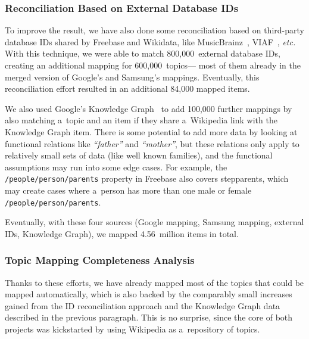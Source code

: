 \documentclass{acm_proc_article-sp}
\begin{document}
\subsubsection{Reconciliation Based on External Database IDs}

To improve the result, we have also done some reconciliation based on third-party database IDs
shared by Freebase and Wikidata, like MusicBrainz~\cite{musicbrainz},
VIAF~\cite{viaf}, \emph{etc.}
With this technique, we were able to match 800,000~external database IDs,
creating an additional mapping for 600,000~topics---%
most of them already in the merged version of Google's and Samsung's mappings.
Eventually, this reconciliation effort resulted in an additional 84,000 mapped items.

We also used Google's Knowledge Graph~\cite{singhal2012} to add 100,000 further mappings
by also matching a~topic and an item if they share a~Wikipedia link with the Knowledge Graph item.
There is some potential to add more data by looking at functional relations
like \textit{``father''} and \textit{``mother''},
but these relations only apply to relatively small sets of data
(like well known families), and the functional assumptions may run into some edge cases.
For example, the \texttt{/people/person/parents} property in Freebase also covers stepparents,
which may create cases where a~person has more than one male or female \texttt{/people/person/parents}.

Eventually, with these four sources (Google mapping, Samsung mapping, external IDs, Knowledge Graph),
we mapped 4.56~million items in total.

\subsubsection{Topic Mapping Completeness Analysis}

Thanks to these efforts, we have already mapped most of the topics that could be mapped automatically,
which is also backed by the comparably small increases gained from the ID reconciliation approach 
and the Knowledge Graph data described in the previous paragraph.
This is no surprise, since the core of both projects was kickstarted by using
Wikipedia as a~repository of topics.
\end{document}
